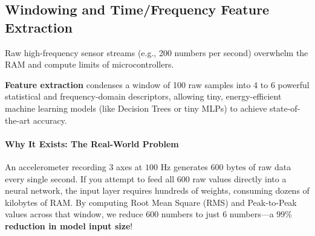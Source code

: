 \subsection{Windowing and Time/Frequency Feature Extraction}

\begin{keyidea}
Raw high-frequency sensor streams (e.g., 200 numbers per second) overwhelm the RAM and compute limits of microcontrollers. 

\textbf{Feature extraction} condenses a window of 100 raw samples into 4 to 6 powerful statistical and frequency-domain descriptors, allowing tiny, energy-efficient machine learning models (like Decision Trees or tiny MLPs) to achieve state-of-the-art accuracy.
\end{keyidea}

\paragraph{Why It Exists: The Real-World Problem}
An accelerometer recording 3 axes at $100\text{ Hz}$ generates $600\text{ bytes}$ of raw data every single second. If you attempt to feed all 600 raw values directly into a neural network, the input layer requires hundreds of weights, consuming dozens of kilobytes of RAM. By computing Root Mean Square (RMS) and Peak-to-Peak values across that window, we reduce 600 numbers to just 6 numbers—a \textbf{$99\%$ reduction in model input size}!

